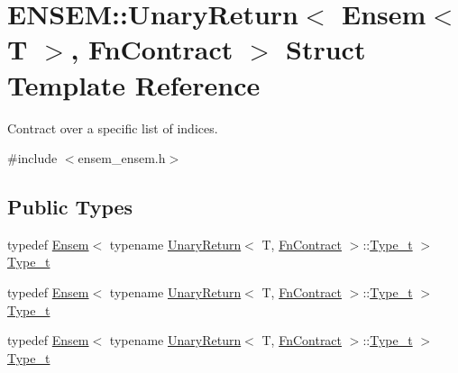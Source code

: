 \hypertarget{structENSEM_1_1UnaryReturn_3_01Ensem_3_01T_01_4_00_01FnContract_01_4}{}\section{E\+N\+S\+EM\+:\+:Unary\+Return$<$ Ensem$<$ T $>$, Fn\+Contract $>$ Struct Template Reference}
\label{structENSEM_1_1UnaryReturn_3_01Ensem_3_01T_01_4_00_01FnContract_01_4}


Contract over a specific list of indices.  




{\ttfamily \#include $<$ensem\+\_\+ensem.\+h$>$}

\subsection*{Public Types}
\begin{DoxyCompactItemize}
\item 
typedef \mbox{\hyperlink{classENSEM_1_1Ensem}{Ensem}}$<$ typename \mbox{\hyperlink{structENSEM_1_1UnaryReturn}{Unary\+Return}}$<$ T, \mbox{\hyperlink{structENSEM_1_1FnContract}{Fn\+Contract}} $>$\+::\mbox{\hyperlink{structENSEM_1_1UnaryReturn_3_01Ensem_3_01T_01_4_00_01FnContract_01_4_a3be6c264185868ff0356a15a3b802b83}{Type\+\_\+t}} $>$ \mbox{\hyperlink{structENSEM_1_1UnaryReturn_3_01Ensem_3_01T_01_4_00_01FnContract_01_4_a3be6c264185868ff0356a15a3b802b83}{Type\+\_\+t}}
\item 
typedef \mbox{\hyperlink{classENSEM_1_1Ensem}{Ensem}}$<$ typename \mbox{\hyperlink{structENSEM_1_1UnaryReturn}{Unary\+Return}}$<$ T, \mbox{\hyperlink{structENSEM_1_1FnContract}{Fn\+Contract}} $>$\+::\mbox{\hyperlink{structENSEM_1_1UnaryReturn_3_01Ensem_3_01T_01_4_00_01FnContract_01_4_a3be6c264185868ff0356a15a3b802b83}{Type\+\_\+t}} $>$ \mbox{\hyperlink{structENSEM_1_1UnaryReturn_3_01Ensem_3_01T_01_4_00_01FnContract_01_4_a3be6c264185868ff0356a15a3b802b83}{Type\+\_\+t}}
\item 
typedef \mbox{\hyperlink{classENSEM_1_1Ensem}{Ensem}}$<$ typename \mbox{\hyperlink{structENSEM_1_1UnaryReturn}{Unary\+Return}}$<$ T, \mbox{\hyperlink{structENSEM_1_1FnContract}{Fn\+Contract}} $>$\+::\mbox{\hyperlink{structENSEM_1_1UnaryReturn_3_01Ensem_3_01T_01_4_00_01FnContract_01_4_a3be6c264185868ff0356a15a3b802b83}{Type\+\_\+t}} $>$ \mbox{\hyperlink{structENSEM_1_1UnaryReturn_3_01Ensem_3_01T_01_4_00_01FnContract_01_4_a3be6c264185868ff0356a15a3b802b83}{Type\+\_\+t}}
\end{DoxyCompactItemize}


